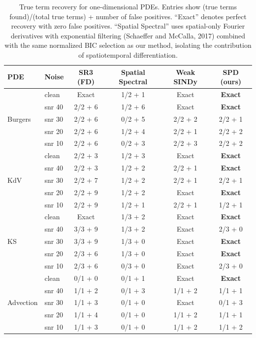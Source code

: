 \documentclass[preprint,12pt]{elsarticle}
\begin{document}
\begin{table}[H]
\centering
\caption{True term recovery for one-dimensional PDEs. Entries show (true terms found)/(total true terms) + number of false positives. ``Exact'' denotes perfect recovery with zero false positives. ``Spatial Spectral'' uses spatial-only Fourier derivatives with exponential filtering (Schaeffer and McCalla, 2017) combined with the same normalized BIC selection as our method, isolating the contribution of spatiotemporal differentiation.}
\label{tab:1d_summary}
\small
\begin{tabular}{llcccc}
\toprule
PDE & Noise & SR3 (FD) & Spatial Spectral & Weak SINDy & SPD (ours) \\
\midrule
\multirow{5}{*}{Burgers}
& clean & Exact & 1/2 + 1 & Exact & \textbf{Exact} \\
& snr 40 & 2/2 + 6 & 1/2 + 6 & Exact & \textbf{Exact} \\
& snr 30 & 2/2 + 6 & 0/2 + 5 & 2/2 + 2 & 2/2 + 1 \\
& snr 20 & 2/2 + 6 & 1/2 + 4 & 2/2 + 1 & 2/2 + 2 \\
& snr 10 & 2/2 + 6 & 0/2 + 3 & 2/2 + 3 & 2/2 + 2 \\
\midrule
\multirow{5}{*}{KdV}
& clean & 2/2 + 3 & 1/2 + 3 & Exact & \textbf{Exact} \\
& snr 40 & 2/2 + 3 & 1/2 + 2 & 2/2 + 1 & \textbf{Exact} \\
& snr 30 & 2/2 + 7 & 1/2 + 2 & 2/2 + 1 & 2/2 + 1 \\
& snr 20 & 2/2 + 9 & 1/2 + 2 & Exact & \textbf{Exact} \\
& snr 10 & 2/2 + 9 & 1/2 + 1 & 2/2 + 1 & 1/2 + 1 \\
\midrule
\multirow{5}{*}{KS}
& clean & Exact & 1/3 + 2 & Exact & \textbf{Exact} \\
& snr 40 & 3/3 + 9 & 1/3 + 2 & Exact & 2/3 + 0 \\
& snr 30 & 3/3 + 9 & 1/3 + 0 & Exact & \textbf{Exact} \\
& snr 20 & 2/3 + 6 & 1/3 + 0 & Exact & \textbf{Exact} \\
& snr 10 & 2/3 + 6 & 0/3 + 0 & Exact & 2/3 + 0 \\
\midrule
\multirow{5}{*}{Advection}
& clean & 0/1 + 0 & 0/1 + 1 & Exact & \textbf{Exact} \\
& snr 40 & 1/1 + 2 & 0/1 + 3 & 1/1 + 2 & 1/1 + 1 \\
& snr 30 & 1/1 + 3 & 0/1 + 0 & Exact & 0/1 + 3 \\
& snr 20 & 1/1 + 4 & 0/1 + 0 & 1/1 + 2 & 1/1 + 1 \\
& snr 10 & 1/1 + 3 & 0/1 + 0 & 1/1 + 2 & 1/1 + 2 \\
\bottomrule
\end{tabular}
\end{table}
\end{document}
